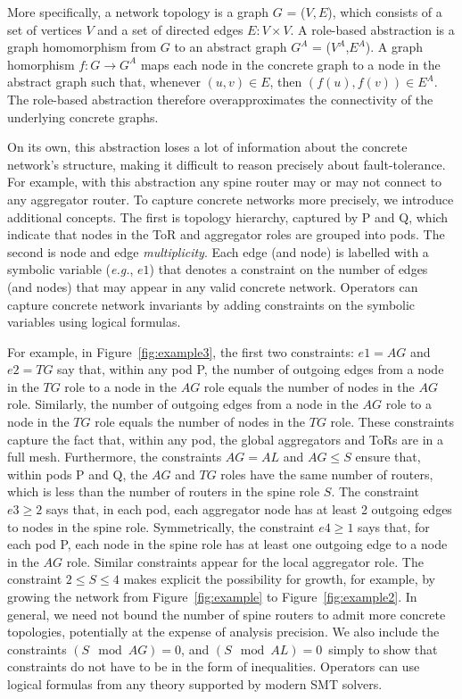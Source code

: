 \documentclass[numbers, 10pt, preprint]{sigplanconf}
\newcommand{\EG}{\emph{e.g.}}
\begin{document}
More specifically, a network topology is a graph $G$ = ($V, E$), which consists of a set of vertices $V$ and a set of directed edges $E \colon V \times V$. A role-based abstraction is a graph homomorphism from $G$ to an abstract graph $G^A$ = ($V^A$,$E^A$). A graph homorphism $f : G \rightarrow G^A$ maps each node in the concrete graph to a node in the abstract graph such that, whenever $(u,v) \in E$, then $(f(u),f(v)) \in E^A$. The role-based abstraction therefore overapproximates the connectivity of the underlying concrete graphs.

On its own, this abstraction loses a lot of information about the concrete network's structure, making it difficult to reason precisely about fault-tolerance.
For example, with this abstraction any spine router may or may not connect to any aggregator router.
%
To capture concrete networks more precisely,
we introduce additional concepts. The first is topology hierarchy, captured by P and Q, which indicate that nodes in the ToR and aggregator roles are grouped into pods.
The second is node and edge \emph{multiplicity}. Each edge (and node) is labelled
with a symbolic variable (\EG, $e1$) that denotes a constraint on the number of edges (and nodes) that may appear in any valid concrete network. Operators can capture concrete network invariants by adding constraints on the symbolic variables using logical formulas.

For example, in Figure~\ref{fig:example3}, the first two constraints: $e1 = AG$ and $e2 = TG$ say that, within any pod P, the number of outgoing edges from a node in the $TG$ role to a node in the $AG$ role equals the number of nodes in the $AG$ role. Similarly, the number of outgoing edges from a node in the $AG$ role to a node in the $TG$ role equals the number of nodes in the $TG$ role. These constraints capture the fact that, within any pod, the global aggregators and ToRs are in a full mesh. Furthermore, the constraints $AG = AL$ and $AG \leq S$ ensure that, within pods P and Q, the $AG$ and $TG$ roles have the same number of routers, which is less than the number of routers in the spine role $S$.
%
The constraint $e3 \geq 2$ says that, in each pod, each aggregator node has at least 2 outgoing edges to nodes in the spine role. Symmetrically, the constraint $e4 \geq 1$ says that, for each pod P, each node in the spine role has at least one outgoing edge to a node in the $AG$ role. Similar constraints appear for the local aggregator role. The constraint $2 \leq S \leq 4$ makes explicit the possibility for growth, for example, by growing the network from Figure~\ref{fig:example} to Figure~\ref{fig:example2}. In general, we need not bound the number of spine routers to admit more concrete topologies, potentially at the expense of analysis precision. We also include the constraints $(S \mod AG) = 0$, and $(S \mod AL) = 0$~simply to show that constraints do not have to be in the form of inequalities. Operators can use logical formulas from any theory supported by modern SMT solvers.
\end{document}
